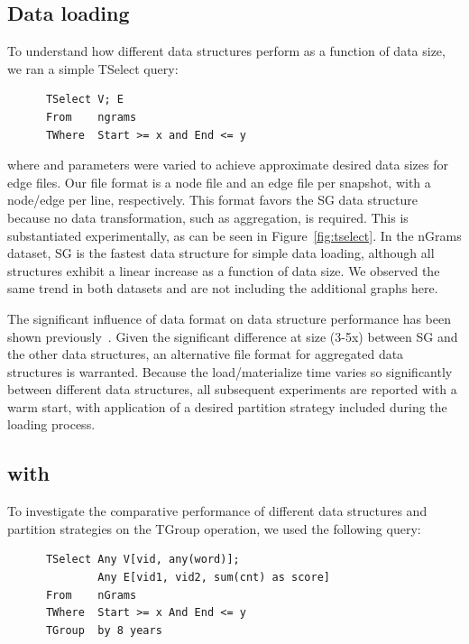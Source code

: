 \subsection{Data loading}

To understand how different data structures perform as a function of
data size, we ran a simple TSelect query:

\begin{small}
\begin{verbatim}
      TSelect V; E
      From    ngrams
      TWhere  Start >= x and End <= y
\end{verbatim}
\end{small}

\noindent where  and  parameters were varied to
achieve approximate desired data sizes for edge files.  Our file
format is a node file and an edge file per snapshot, with a node/edge
per line, respectively.  This format favors the SG data structure
because no data transformation, such as aggregation, is required.
This is substantiated experimentally, as can be seen in
Figure~\ref{fig:tselect}.  In the nGrams dataset, SG is the fastest
data structure for simple data loading, although all structures
exhibit a linear increase as a function of data size.  We observed the
same trend in both datasets and are not including the additional
graphs here. 

The significant influence of data format on data structure performance
has been shown previously~\cite{DBLP:journals/tos/MiaoHLWYZPCC15}.
Given the significant difference at size (3-5x) between SG and the
other data structures, an alternative file format for aggregated data
structures is warranted.  Because the load/materialize time varies so
significantly between different data structures, all subsequent
experiments are reported with a warm start, with application of a
desired partition strategy included during the loading process.

\subsection{ with }

To investigate the comparative performance of different data
structures and partition strategies on the TGroup operation, we used
the following query:

\begin{small}
\begin{verbatim}
      TSelect Any V[vid, any(word)];
              Any E[vid1, vid2, sum(cnt) as score]
      From    nGrams
      TWhere  Start >= x And End <= y
      TGroup  by 8 years
\end{verbatim}
\end{small}

